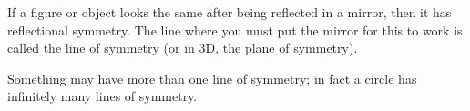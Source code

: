 If a figure or object looks the same after being reflected in a mirror,
then it has reflectional symmetry. The line where you must put the
mirror for this to work is called the line of symmetry (or in 3D, the plane of symmetry).
\par
Something may have more than one line of symmetry; in fact a circle
has infinitely many lines of symmetry.